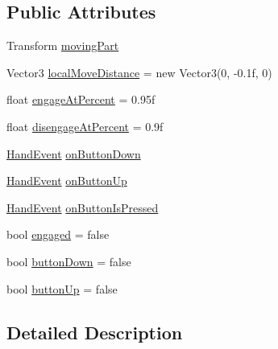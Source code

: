 \subsection*{Public Attributes}
\begin{DoxyCompactItemize}
\item 
Transform \mbox{\hyperlink{class_valve_1_1_v_r_1_1_interaction_system_1_1_hover_button_a512d12075389d4852d9aad92c12980d2}{moving\+Part}}
\item 
Vector3 \mbox{\hyperlink{class_valve_1_1_v_r_1_1_interaction_system_1_1_hover_button_a4c0f3a4df1b5b288c48e133454a907dc}{local\+Move\+Distance}} = new Vector3(0, -\/0.\+1f, 0)
\item 
float \mbox{\hyperlink{class_valve_1_1_v_r_1_1_interaction_system_1_1_hover_button_acc32c85f52d4f348517aecde60fc9727}{engage\+At\+Percent}} = 0.\+95f
\item 
float \mbox{\hyperlink{class_valve_1_1_v_r_1_1_interaction_system_1_1_hover_button_a6791c1abc045301ea1f1d7708c352a4d}{disengage\+At\+Percent}} = 0.\+9f
\item 
\mbox{\hyperlink{class_valve_1_1_v_r_1_1_interaction_system_1_1_hand_event}{Hand\+Event}} \mbox{\hyperlink{class_valve_1_1_v_r_1_1_interaction_system_1_1_hover_button_acb3cd0d38ff7a054b761c7e232817ec5}{on\+Button\+Down}}
\item 
\mbox{\hyperlink{class_valve_1_1_v_r_1_1_interaction_system_1_1_hand_event}{Hand\+Event}} \mbox{\hyperlink{class_valve_1_1_v_r_1_1_interaction_system_1_1_hover_button_ac1ed67633ae9ca279bff0f81ae8de35d}{on\+Button\+Up}}
\item 
\mbox{\hyperlink{class_valve_1_1_v_r_1_1_interaction_system_1_1_hand_event}{Hand\+Event}} \mbox{\hyperlink{class_valve_1_1_v_r_1_1_interaction_system_1_1_hover_button_a34e71d3922347dc2d2e40953783f507d}{on\+Button\+Is\+Pressed}}
\item 
bool \mbox{\hyperlink{class_valve_1_1_v_r_1_1_interaction_system_1_1_hover_button_a166d3835be5b4c2ec9996d7e82af0c25}{engaged}} = false
\item 
bool \mbox{\hyperlink{class_valve_1_1_v_r_1_1_interaction_system_1_1_hover_button_a61478fee1db23571294df50183cb9f91}{button\+Down}} = false
\item 
bool \mbox{\hyperlink{class_valve_1_1_v_r_1_1_interaction_system_1_1_hover_button_a76e76b2f1b2f893627db0ba70d38c52a}{button\+Up}} = false
\end{DoxyCompactItemize}


\subsection{Detailed Description}


